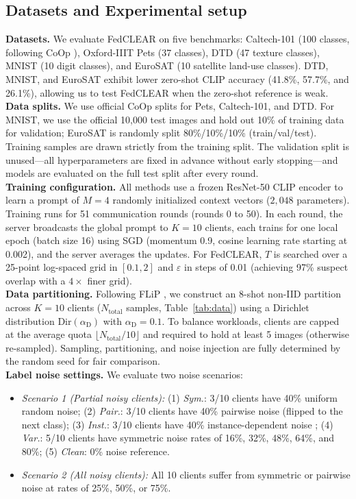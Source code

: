 \documentclass[runningheads]{llncs}
\begin{document}
\subsection{Datasets and Experimental setup}
\textbf{Datasets.} We evaluate FedCLEAR on five benchmarks: Caltech-101 (100 classes, following CoOp \cite{zhou2022learning}), Oxford-IIIT Pets (37 classes), DTD (47 texture classes), MNIST (10 digit classes), and EuroSAT (10 satellite land-use classes). DTD, MNIST, and EuroSAT exhibit lower zero-shot CLIP accuracy (41.8\%, 57.7\%, and 26.1\%), allowing us to test FedCLEAR when the zero-shot reference is weak. \\
\textbf{Data splits.} We use official CoOp \cite{zhou2022learning} splits for Pets, Caltech-101, and DTD. For MNIST, we use the official 10{,}000 test images and hold out 10\% of training data for validation; EuroSAT is randomly split 80\%/10\%/10\% (train/val/test). Training samples are drawn strictly from the training split. The validation split is unused—all hyperparameters are fixed in advance without early stopping—and models are evaluated on the full test split after every round.\\
\textbf{Training configuration.} All methods use a frozen ResNet-50 CLIP encoder to learn a prompt of $M = 4$ randomly initialized context vectors ($2{,}048$ parameters). Training runs for 51 communication rounds (rounds 0 to 50). In each round, the server broadcasts the global prompt to $K = 10$ clients, each trains for one local epoch (batch size 16) using SGD (momentum 0.9, cosine learning rate starting at 0.002), and the server averages the updates. For FedCLEAR, $T$ is searched over a 25-point log-spaced grid in $[0.1, 2]$ and $\varepsilon$ in steps of 0.01 (achieving 97\% suspect overlap with a $4\times$ finer grid). \\
\textbf{Data partitioning.} Following FLiP \cite{liao2025flip}, we construct an 8-shot non-IID partition across $K = 10$ clients ($N_{\text{total}}$ samples, Table~\ref{tab:data}) using a Dirichlet distribution $\text{Dir}(\alpha_{\mathrm{D}})$ with $\alpha_{\mathrm{D}} = 0.1$. To balance workloads, clients are capped at the average quota $\lfloor N_{\text{total}}/10 \rfloor$ and required to hold at least 5 images (otherwise re-sampled). Sampling, partitioning, and noise injection are fully determined by the random seed for fair comparison. \\
\textbf{Label noise settings.} We evaluate two noise scenarios:
\begin{itemize}
    \item \textit{Scenario 1 (Partial noisy clients):} (1) \textit{Sym.}: 3/10 clients have 40\% uniform random noise; (2) \textit{Pair.}: 3/10 clients have 40\% pairwise noise (flipped to the next class); (3) \textit{Inst.}: 3/10 clients have 40\% instance-dependent noise \cite{xia2020part}; (4) \textit{Var.}: 5/10 clients have symmetric noise rates of 16\%, 32\%, 48\%, 64\%, and 80\%; (5) \textit{Clean}: 0\% noise reference.
    \item \textit{Scenario 2 (All noisy clients):} All 10 clients suffer from symmetric or pairwise noise at rates of 25\%, 50\%, or 75\%.
\end{itemize}
\end{document}
